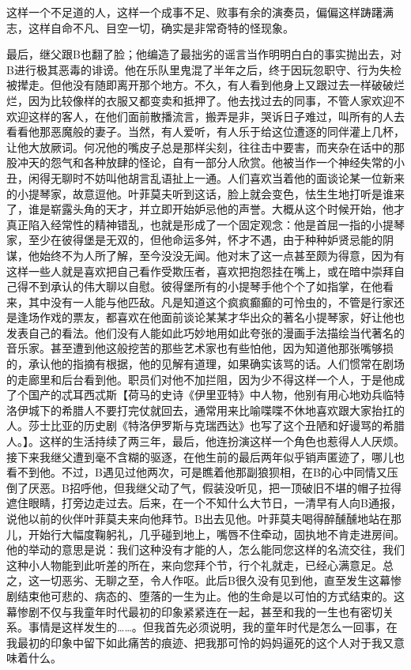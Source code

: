 \documentclass[12pt, UTF8]{ctexbook}
\begin{document}
\par 这样一个不足道的人，这样一个成事不足、败事有余的演奏员，偏偏这样踌躇满志，这样自命不凡、目空一切，确实是非常奇特的怪现象。
\par 最后，继父跟B也翻了脸；他编造了最拙劣的谣言当作明明白白的事实抛出去，对B进行极其恶毒的诽谤。他在乐队里鬼混了半年之后，终于因玩忽职守、行为失检被撵走。但他没有随即离开那个地方。不久，有人看到他身上又跟过去一样破破烂烂，因为比较像样的衣服又都变卖和抵押了。他去找过去的同事，不管人家欢迎不欢迎这样的客人，在他们面前散播流言，搬弄是非，哭诉日子难过，叫所有的人去看看他那恶魔般的妻子。当然，有人爱听，有人乐于给这位遭逐的同伴灌上几杯，让他大放厥词。何况他的嘴皮子总是那样尖刻，往往击中要害，而夹杂在话中的那股冲天的怨气和各种放肆的怪论，自有一部分人欣赏。他被当作一个神经失常的小丑，闲得无聊时不妨叫他胡言乱语扯上一通。人们喜欢当着他的面谈论某一位新来的小提琴家，故意逗他。叶菲莫夫听到这话，脸上就会变色，怯生生地打听是谁来了，谁是崭露头角的天才，并立即开始妒忌他的声誉。大概从这个时候开始，他才真正陷入经常性的精神错乱，也就是形成了一个固定观念：他是首屈一指的小提琴家，至少在彼得堡是无双的，但他命运多舛，怀才不遇，由于种种妒贤忌能的阴谋，他始终不为人所了解，至今没没无闻。他对末了这一点甚至颇为得意，因为有这样一些人就是喜欢把自己看作受欺压者，喜欢把抱怨挂在嘴上，或在暗中崇拜自己得不到承认的伟大聊以自慰。彼得堡所有的小提琴手他个个了如指掌，在他看来，其中没有一人能与他匹敌。凡是知道这个疯疯癫癫的可怜虫的，不管是行家还是逢场作戏的票友，都喜欢在他面前谈论某某才华出众的著名小提琴家，好让他也发表自己的看法。他们没有人能如此巧妙地用如此夸张的漫画手法描绘当代著名的音乐家。甚至遭到他这般挖苦的那些艺术家也有些怕他，因为知道他那张嘴够损的，承认他的指摘有根据，他的见解有道理，如果确实该骂的话。人们惯常在剧场的走廊里和后台看到他。职员们对他不加拦阻，因为少不得这样一个人，于是他成了个国产的忒耳西忒斯【荷马的史诗《伊里亚特》中人物，他别有用心地劝兵临特洛伊城下的希腊人不要打完仗就回去，通常用来比喻喋喋不休地喜欢跟大家抬扛的人。莎士比亚的历史剧《特洛伊罗斯与克瑞西达》也写了这个丑陋和好谩骂的希腊人。】。这样的生活持续了两三年，最后，他连扮演这样一个角色也惹得人人厌烦。接下来我继父遭到毫不含糊的驱逐，在他生前的最后两年似乎销声匿迹了，哪儿也看不到他。不过，B遇见过他两次，可是瞧着他那副狼狈相，在B的心中同情又压倒了厌恶。B招呼他，但我继父动了气，假装没听见，把一顶破旧不堪的帽子拉得遮住眼睛，打旁边走过去。后来，在一个不知什么大节日，一清早有人向B通报，说他以前的伙伴叶菲莫夫来向他拜节。B出去见他。叶菲莫夫喝得醉醺醺地站在那儿，开始行大幅度鞠躬礼，几乎碰到地上，嘴唇不住牵动，固执地不肯走进房间。他的举动的意思是说：我们这种没有才能的人，怎么能同您这样的名流交往，我们这种小人物能到此听差的所在，来向您拜个节，行个礼就走，已经心满意足。总之，这一切恶劣、无聊之至，令人作呕。此后B很久没有见到他，直至发生这幕惨剧结束他可悲的、病态的、堕落的一生为止。他的生命是以可怕的方式结束的。这幕惨剧不仅与我童年时代最初的印象紧紧连在一起，甚至和我的一生也有密切关系。事情是这样发生的……。但我首先必须说明，我的童年时代是怎么一回事，在我最初的印象中留下如此痛苦的痕迹、把我那可怜的妈妈逼死的这个人对于我又意味着什么。
\end{document}
